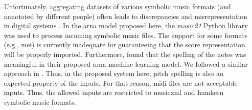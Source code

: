 
Unfortunately, aggregating datasets of various symbolic
music formats (and annotated by different people) often
leads to discrepancies and misrepresentation in digital
systems \parencite{napoleslopez2018encoding,
napoleslopez2019effects}. In the \gls{arna} model proposed
here, the \emph{music21} Python library
\parencite{cuthbert2010music21} was used to process incoming
symbolic music files. The support for some formats (e.g.,
\gls{mei}) is currently inadequate for guaranteeing that the
score representation will be properly imported. Furthermore,
\textcite{micchi2020not} found that the spelling of the
notes was meaningful in their proposed \gls{arna} machine
learning model. We followed a similar approach in
\textcite{napoleslopez2021augmentednet}. Thus, in the
proposed system here, pitch spelling is also an expected
property of the inputs. For that reason, \gls{midi} files
are not acceptable inputs. Thus, the allowed inputs are
restricted to \gls{musicxml} and \gls{humkern} symbolic
music formats. 
